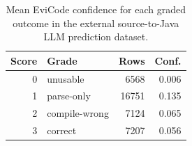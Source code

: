 \begin{table}[!htbp]
\centering
\scriptsize
\begin{tabular}{rlrr}
\toprule
Score & Grade & Rows & Conf. \\
\midrule
0 & unusable & 6568 & 0.006 \\
1 & parse-only & 16751 & 0.135 \\
2 & compile-wrong & 7124 & 0.065 \\
3 & correct & 7207 & 0.056 \\
\bottomrule
\end{tabular}
\vspace{0.5em}
\caption{Mean EviCode confidence for each graded outcome in the external source-to-Java LLM prediction dataset.}
\label{tab:llm-score-confidence}
\end{table}
